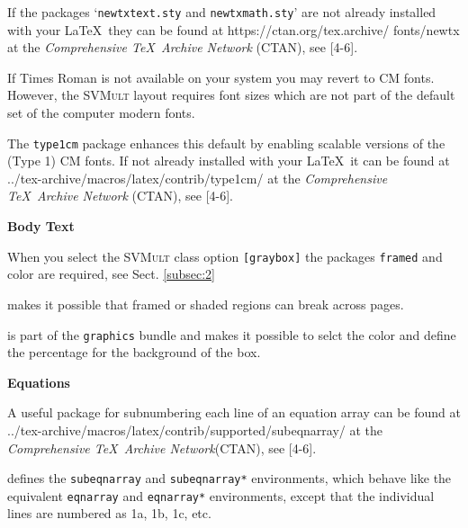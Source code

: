 \documentclass[graybox]{svmult}
\begin{document}
\begin{refguide}
\begin{sloppy}
If the packages `\texttt{newtxtext.sty} and \texttt{newtxmath.sty}' are not already installed
with your \LaTeX\ they can be found at https://ctan.org/tex.archive/ fonts/newtx at the \textit{Comprehensive \TeX\ Archive Network} (CTAN), see [4-­6].


If Times Roman is not available on your system you may revert to CM fonts.
However, the \textsc{SVMult} layout requires font sizes which are not part of the
default set of the computer modern fonts.

\begin{description}
\item[\texttt{type1cm.sty}] The \texttt{type1cm} package enhances this default by enabling scalable versions of the (Type 1) CM fonts. If
not already installed with your \LaTeX\ it can be found
at ../tex-archive/macros/latex/contrib/type1cm/ at the
\textit{Comprehensive \TeX\ Archive Network} (CTAN), see [4-­6].
\end{description}


\textbf{Body Text}


When you select the \textsc{SVMult} class option \texttt{[graybox]} the packages \texttt{framed} and
color are required, see Sect. \ref{subsec:2}

\begin{description}
\item[\texttt{framed.sty}] makes it possible that framed or shaded regions can
break across pages.
\item[\texttt{color.sty}] is part of the \texttt{graphics} bundle and makes it possible to
selct the color and define the percentage for the background of the box.
\end{description}


\textbf{Equations}


A useful package for subnumbering each line of an equation array can be found
at ../tex-archive/macros/latex/contrib/supported/subeqnarray/ at the \textit{Comprehensive \TeX\ Archive Network}(CTAN), see [4-­6].

\begin{description}
\item[\texttt{subeqnarray.sty}] defines the \texttt{subeqnarray} and \texttt{subeqnarray*} environments, which behave like the equivalent \texttt{eqnarray} and \texttt{eqnarray*} environments, except that the individual
lines are numbered as 1a, 1b, 1c, etc.
\end{description}



\end{sloppy}
\end{refguide}
\end{document}
